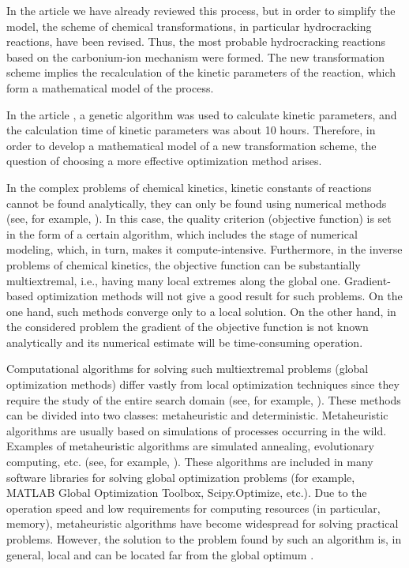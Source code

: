 \documentclass[mathematics,article,submit,pdftex,moreauthors]{Definitions/mdpi}
\begin{document}
In the article \cite{enik2021} we have already reviewed this process, but in order to simplify the model, the scheme of chemical transformations, in particular hydrocracking reactions, have been revised. Thus, the most probable hydrocracking reactions based on the carbonium-ion mechanism were formed. The new transformation scheme implies the recalculation of the kinetic parameters of the reaction, which form a mathematical model of the process.

In the article \cite{enik2021}, a genetic algorithm was used to calculate kinetic parameters, and the calculation time of kinetic parameters was about 10 hours. Therefore, in order to develop a mathematical model of a new transformation scheme, the question of choosing a more effective optimization method arises.

In the complex problems of chemical kinetics, kinetic constants of reactions cannot be found analytically, they can only be found using numerical methods (see, for example, \cite{Zaynullin2020,Enikeeva2020,Koledina2019}). In this case, the quality criterion (objective function) is set in the form of a certain algorithm, which includes the stage of numerical modeling, which, in turn, makes it compute-intensive. Furthermore, in the inverse problems of chemical kinetics, the objective function can be substantially multiextremal, i.e., having many local extremes along the global one. 
\textcolor[rgb]{1,0,0}{Gradient-based optimization methods will not give a good result for such problems. On the one hand, such methods converge only to a local solution. On the other hand, in the considered problem the gradient of the objective function is not known analytically and its numerical estimate will be time-consuming operation.}

Computational algorithms for solving such multiextremal problems (global optimization methods) differ vastly from local optimization techniques since they require the study of the entire search domain (see, for example, \cite{PaulaviciusZilinskas2014,Sergeyev2017}). These methods can be divided into two classes: metaheuristic and deterministic. Metaheuristic algorithms are usually based on simulations of processes occurring in the wild.
Examples of metaheuristic algorithms are simulated annealing, evolutionary computing, etc. (see, for example, \cite{Battiti2009,Eiben2015}).
These algorithms are included in many software libraries for solving global optimization problems (for example, MATLAB Global Optimization Toolbox, Scipy.Optimize, etc.).
Due to the operation speed and low requirements for computing resources (in particular, memory), metaheuristic algorithms have become widespread for solving practical problems. However, the solution to the problem found by such an algorithm is, in general, local and can be located far from the global optimum \cite{Kvasov2018}. 
\end{document}
